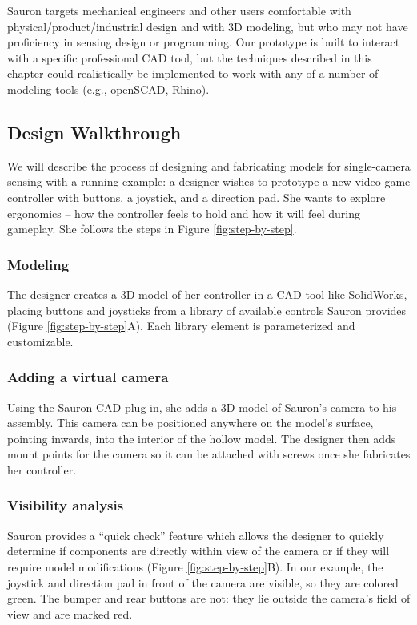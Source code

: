     Sauron targets mechanical engineers and other users comfortable with physical/product/industrial design and with 3D modeling, but who may not have proficiency in sensing design or programming. Our prototype is built to interact with a specific professional CAD tool, but the techniques described in this chapter could realistically be implemented to work with any of a number of modeling tools (e.g., openSCAD, Rhino).

    \subsection{Design Walkthrough}
    We will describe the process of designing and fabricating models for single-camera sensing with a running example: a designer wishes to prototype a new video game controller with buttons, a joystick, and a direction pad. She wants to explore ergonomics -- how the controller feels to hold and how it will feel during gameplay. She follows the steps in Figure \ref{fig:step-by-step}.


\subsubsection{Modeling} The designer creates a 3D model of her controller in a CAD tool like SolidWorks, placing buttons and joysticks from a library of available controls Sauron provides (Figure \ref{fig:step-by-step}A). Each library element is parameterized and customizable.

\subsubsection{Adding a virtual camera} Using the Sauron CAD plug-in, she adds a 3D model of Sauron's camera to his assembly. This camera can be positioned anywhere on the model's surface, pointing inwards, into the interior of the hollow model. The designer then adds mount points for the camera so it can be attached with screws once she fabricates her controller.

\subsubsection{Visibility analysis} Sauron provides a ``quick check'' feature which allows the designer to quickly determine if components are directly within view of the camera or if they will require model modifications (Figure \ref{fig:step-by-step}B). %
In our example, the joystick and direction pad in front of the camera are visible, so they are colored green. The bumper and rear buttons are not: they lie outside the camera's field of view and are marked red. 

